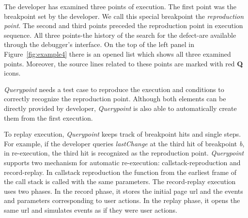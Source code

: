 \documentclass{sig-alternate}
\begin{document}
The developer has examined three points of execution. The first point  was the breakpoint set by the developer. 
We call this special breakpoint the \textit{reproduction point}.
The second and third points preceded the reproduction point in execution sequence.
All three points-the history
of the search for the defect-are available through the debugger's
interface. On the top of the left panel in Figure~\ref{fig:example4}
there is an opened list which shows all three examined points. Moreover, the source lines related to these
points are marked with red \textbf{Q} icons.


\textit{Querypoint} needs a test case to reproduce the
execution and conditions to correctly recognize the reproduction point. 
Although both elements can be directly provided by developer, \textit{Querypoint}
is also able to automatically create them from the first execution. 

To replay execution, \textit{Querypoint} keeps track of breakpoint hits and single steps. For example, 
if the developer queries \textit{lastChange} at the third hit of breakpoint \textit{b}, in
re-execution, the third hit is recognized as the reproduction point. \textit{Querypoint} supports two mechanism
for automatic re-execution: callstack-reproduction and record-replay. In callstack reproduction the function from
the earliest frame of the call stack is called with the same parameters. The record-replay execution uses two phases. In the record phase, it 
stores the initial page url and the events and parameters corresponding to user actions. In the replay phase, it opens
the same url and simulates events as if they were user actions. 
\end{document}

